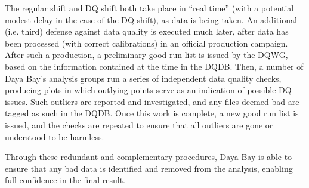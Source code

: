 \documentclass[../thesis.tex]{subfiles}
\begin{document}
The regular shift and DQ shift both take place in ``real time'' (with a potential modest delay in the case of the DQ shift), as data is being taken. An additional (i.e. third) defense against data quality is executed much later, after data has been processed (with correct calibrations) in an official production campaign. After such a production, a preliminary good run list is issued by the DQWG, based on the information contained at the time in the DQDB. Then, a number of Daya Bay's analysis groups run a series of independent data quality checks, producing plots in which outlying points serve as an indication of possible DQ issues. Such outliers are reported and investigated, and any files deemed bad are tagged as such in the DQDB. Once this work is complete, a new good run list is issued, and the checks are repeated to ensure that all outliers are gone or understood to be harmless.

Through these redundant and complementary procedures, Daya Bay is able to ensure that any bad data is identified and removed from the analysis, enabling full confidence in the final result.
\end{document}
